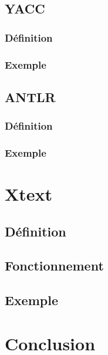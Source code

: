 \documentclass{beamer}
\begin{document}
\subsection{YACC}



\subsubsection{Définition}



\subsubsection{Exemple}



\subsection{ANTLR}



\subsubsection{Définition}



\subsubsection{Exemple}



\section{Xtext}

\subsection{Définition}



\subsection{Fonctionnement}



\subsection{Exemple}




\section{Conclusion}
\end{document}

